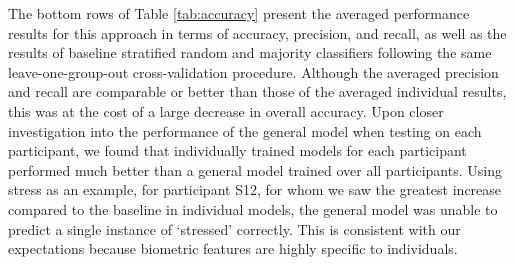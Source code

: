 The bottom  rows of Table \ref{tab:accuracy} present the averaged performance results for this approach in terms of accuracy, precision, and recall, as well as the results of baseline stratified random and majority classifiers following the same leave-one-group-out cross-validation procedure. Although the averaged precision and recall are comparable or better than those of the averaged individual results, this was at the cost of a large decrease in overall accuracy.  Upon closer investigation into the performance of the general model when testing on each participant, we found that individually trained models for each participant performed much better than a general model trained over all participants. Using stress as an example, for participant S12, for whom we saw the greatest increase compared to the baseline in individual models, the general model was unable to predict a single instance of `stressed' correctly. This is consistent with our expectations because biometric features are highly specific to individuals.



